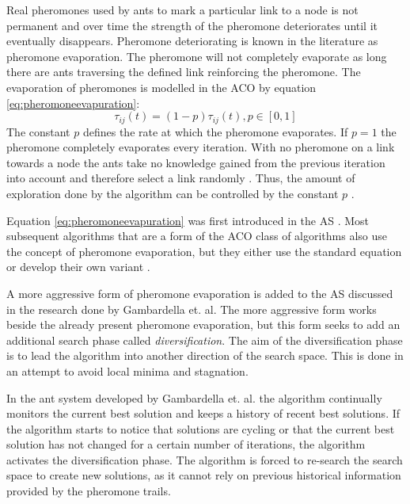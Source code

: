 Real pheromones used by ants to mark a particular link to a node is not permanent and over time the strength of the pheromone deteriorates until it eventually disappears. Pheromone deteriorating is known in the literature as pheromone evaporation. The pheromone will not completely evaporate as long there are ants traversing the defined link reinforcing the pheromone. The evaporation of pheromones is modelled in the ACO by equation \ref{eq:pheromoneevapuration}\cite{CompuIntelligenceIntro,AntsAndStigmergy,AntIntroTrends,AntSurvey}:
\begin{equation}
\label{eq:pheromoneevapuration}
	\tau_{ij}(t) = (1-p)\tau_{ij}(t), p\in [0,1]
\end{equation}
The constant $p$ defines the rate at which the pheromone evaporates. If $p=1$ the pheromone completely evaporates every iteration. With no pheromone on a link towards a node the ants take no knowledge gained from the previous iteration into account and therefore select a link randomly \cite{CompuIntelligenceIntro,AntsAndStigmergy}. Thus, the amount of exploration done by the algorithm can be controlled by the constant $p$ \cite{CompuIntelligenceIntro,AntsAndStigmergy}.

Equation \ref{eq:pheromoneevapuration} was first introduced in the AS \cite{CompuIntelligenceIntro,AntsAndStigmergy,AntIntroTrends,AntSurvey}. Most subsequent algorithms that are a form of the ACO class of algorithms also use the concept of pheromone evaporation, but they either use the standard equation or develop their own variant \cite{CompuIntelligenceIntro,AntsAndStigmergy,AntIntroTrends,AntSurvey}.

A more aggressive form of pheromone evaporation  is added to the AS discussed in the research done by Gambardella et. al\cite{AntQAP}. The more aggressive form works beside the already present pheromone evaporation, but this form seeks to add an additional search phase called \emph{diversification}\cite{AntQAP}. The aim of the diversification phase is to lead the algorithm into another direction of the search space\cite{AntQAP}. This is done in an attempt to avoid local minima and stagnation\cite{AntQAP}.

In the ant system developed by Gambardella et. al. the algorithm continually monitors the current best solution and keeps a history of recent best solutions\cite{AntQAP}. If the algorithm starts to notice that solutions are cycling or that the current best solution has not changed for a certain number of iterations, the algorithm activates the diversification phase\cite{AntQAP}. The algorithm is forced to re-search the search space to create new solutions, as it cannot rely on previous historical information provided by the pheromone trails\cite{AntQAP}.

